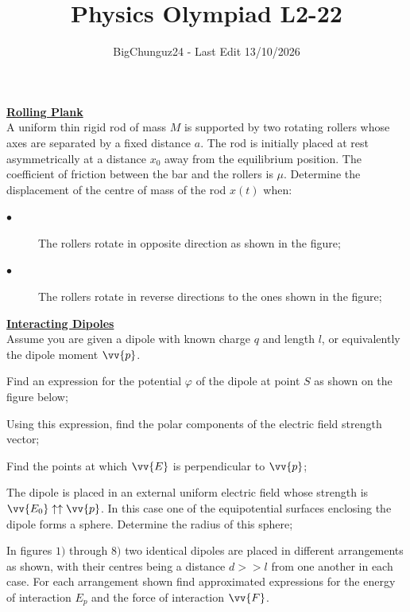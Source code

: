 \documentclass[a4paper]{article}
\title{\Huge Physics Olympiad L2-22}
\author{BigChunguz24 - Last Edit 13/10/2026}
\date{}
\begin{document}
	\maketitle
	
	\Problem
	\textbf{\underline{Rolling Plank}}
	\\
	A uniform thin rigid rod of mass $M$ is supported by two rotating rollers whose axes are separated by a fixed distance $a$. The rod is initially placed at rest asymmetrically at a distance $x_0$ away from the equilibrium position. The coefficient of friction between the bar and the rollers is $\mu$. Determine the displacement of the centre of mass of the rod $x(t)$ when:
	\begin{description}
		\item[$\bullet$] The rollers rotate in opposite direction as shown in the figure;
		\item[$\bullet$] The rollers rotate in reverse directions to the ones shown in the figure;
	\end{description}
	
	
	
	\Problem
	\textbf{\underline{Interacting Dipoles}}
	\\
	Assume you are given a dipole with known charge $q$ and length $l$, or equivalently the dipole moment $\vv{p}$.
	\begin{description}[leftmargin=!, labelwidth=\widthof{$\bullet$}]
		\item[$\bullet$] Find an expression for the potential $\varphi$ of the dipole at point $S$ as shown on the figure below;
		\item[$\bullet$] Using this expression, find the polar components of the electric field strength vector;
		\item[$\bullet$] Find the points at which $\vv{E}$ is perpendicular to $\vv{p}$;
		\item[$\bullet$] The dipole is placed in an external uniform electric field whose strength is $\vv{E_0} \uparrow \uparrow \vv{p}$. In this case one of the equipotential surfaces enclosing the dipole forms a sphere. Determine the radius of this sphere;
		\item[$\bullet$] In figures $1)$ through $8)$ two identical dipoles are placed in different arrangements as shown, with their centres being a distance $d >> l$ from one another in each case. For each arrangement shown find approximated expressions for the energy of interaction $E_p$ and the force of interaction $\vv{F}$.
	\end{description}
	
\end{document}
